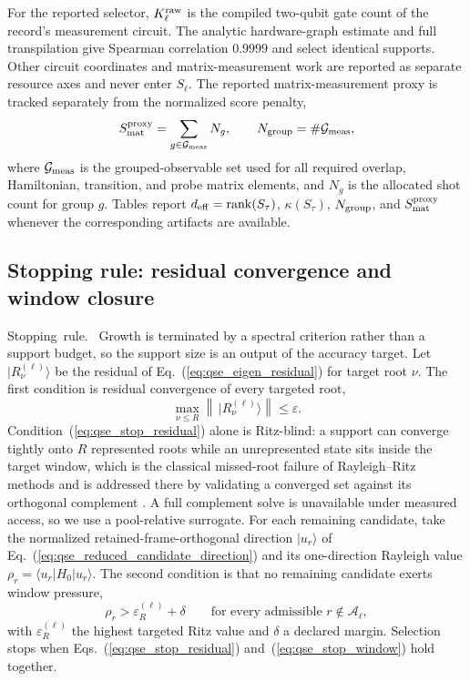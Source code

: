 \documentclass[
  reprint,
  amsmath,
  amssymb,
  aps,
  pra,
  nofootinbib,
  superscriptaddress,
  floatfix
]{revtex4-2}
\newcommand{\tentative}[1]{\textcolor{red!70!black}{#1}}
\newcommand{\structlabel}[1]{\noindent\mbox{\tentative{#1.}}~}
\newcommand{\Acal}{\mathcal{A}}
\newcommand{\rank}{\operatorname{rank}}
\newcommand{\eps}{\varepsilon}
\newcommand{\ket}[1]{|#1\rangle}
\newcommand{\bra}[1]{\langle #1|}
\begin{document}
For the reported selector, $K_\ell^{\rm raw}$ is the compiled two-qubit gate
count of the record's measurement circuit.  The analytic hardware-graph
estimate and full transpilation give Spearman correlation $0.9999$ and select
identical supports.  Other circuit coordinates and matrix-measurement work are
reported as separate resource axes and never enter $S_\ell$.
The reported matrix-measurement proxy is tracked separately from the normalized score penalty,
\begin{equation}
S_{\rm mat}^{\rm proxy}
=
\sum_{g\in\mathcal G_{\rm meas}}N_g,
\qquad
N_{\rm group}
=
\#\mathcal G_{\rm meas},
\label{eq:qse_reported_measurement_proxy}
\end{equation}
where \(\mathcal G_{\rm meas}\) is the grouped-observable set used for all required overlap, Hamiltonian, transition, and probe matrix elements, and \(N_g\) is the allocated shot count for group \(g\).  Tables report \(d_{\rm eff}=\rank(S_\tau)\), \(\kappa(S_\tau)\), \(N_{\rm group}\), and \(S_{\rm mat}^{\rm proxy}\) whenever the corresponding artifacts are available.


\subsection{Stopping rule: residual convergence and window closure}
\label{sec:stopping_rule}

\structlabel{Stopping rule}
Growth is terminated by a spectral criterion rather than a support budget, so the support size is an output of the accuracy target.  Let $\ket{R_\nu^{(\ell)}}$ be the residual of Eq.~(\ref{eq:qse_eigen_residual}) for target root $\nu$.  The first condition is residual convergence of every targeted root,
\begin{equation}
\max_{\nu\le R}\left\|\,\ket{R_\nu^{(\ell)}}\right\|\le\eps .
\label{eq:qse_stop_residual}
\end{equation}
Condition~(\ref{eq:qse_stop_residual}) alone is Ritz-blind: a support can converge tightly onto $R$ represented roots while an unrepresented state sits inside the target window, which is the classical missed-root failure of Rayleigh--Ritz methods and is addressed there by validating a converged set against its orthogonal complement \cite{McCombs2006IVE}.  A full complement solve is unavailable under measured access, so we use a pool-relative surrogate.  For each remaining candidate, take the normalized retained-frame-orthogonal direction $\ket{u_r}$ of Eq.~(\ref{eq:qse_reduced_candidate_direction}) and its one-direction Rayleigh value $\rho_r=\bra{u_r}H_0\ket{u_r}$.  The second condition is that no remaining candidate exerts window pressure,
\begin{equation}
\rho_r>\varepsilon_R^{(\ell)}+\delta
\qquad\text{for every admissible }r\notin\Acal_\ell,
\label{eq:qse_stop_window}
\end{equation}
with $\varepsilon_R^{(\ell)}$ the highest targeted Ritz value and $\delta$ a declared margin.  Selection stops when Eqs.~(\ref{eq:qse_stop_residual}) and~(\ref{eq:qse_stop_window}) hold together.
\end{document}

